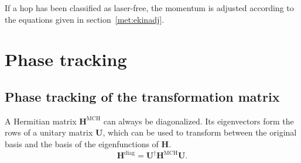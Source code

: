 \documentclass[a4paper,11pt,DIV=15,openany,twoside=false]{scrbook}
\newcommand{\VEC}[1]{\ensuremath{\mathbf{#1}}}
\begin{document}
If a hop has been classified as laser-free, the momentum is adjusted according to the equations given in section~\ref{met:ekinadj}.

\section{Phase tracking}

\subsection{Phase tracking of the transformation matrix}\label{met:phase_track}

A Hermitian matrix $\VEC{H}^{\text{MCH}}$ can always be diagonalized. Its eigenvectors form the rows of a unitary matrix $\VEC{U}$, which can be used to transform between the original basis and the basis of the eigenfunctions of $\VEC{H}$. 
\begin{equation}
  \VEC{H}^{\text{diag}}=\VEC{U}^\dagger\VEC{H}^{\text{MCH}}\VEC{U}.
\end{equation}
\end{document}
